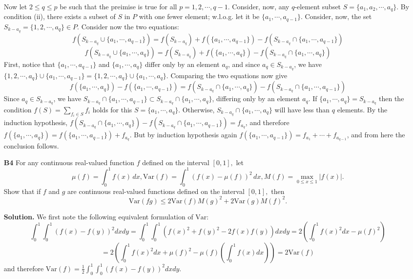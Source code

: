 \documentclass[11pt,a4paper]{article}
\newcommand{\<}{\langle}
\renewcommand{\>}{\rangle}
\newcommand{\dsum}{\displaystyle\sum}
\begin{document}
\begin{enumerate}
	Now let $2\le q\le p$ be such that the preimise is true for all $p=1, 2, \cdots , q-1$. Consider, now, any $q$-element subset $S=\{a_1, a_2, \cdots , a_q\}$. By condition (ii), there exists a subset of $S$ in $P$ with one fewer element; w.l.o.g. let it be $\{a_1, \cdots , a_{q-1}\}$. Consider, now, the set $S_{k-a_q}=\{1, 2, \cdots , a_q\}\in P.$ Consider now the two equations: 
	\[
	f(S_{k-a_q}\cup \{a_1, \cdots , a_{q-1}\}) = f(S_{k-a_q}) + f(\{a_1, \cdots , a_{q-1}\}) - f(S_{k-a_q}\cap \{a_1, \cdots , a_{q-1}\})
	\]
	\[
	f(S_{k-a_q}\cup \{a_1, \cdots , a_{q}\}) = f(S_{k-a_q}) + f(\{a_1, \cdots , a_{q}\}) - f(S_{k-a_q}\cap \{a_1, \cdots , a_{q}\})
	\]
	First, notice that $\{a_1, \cdots , a_{q-1}\}$ and $\{a_1, \cdots , a_{q}\}$ differ only by an element $a_q$, and since $a_q\in S_{k-a_q}$, we have $\{1, 2, \cdots , a_q\}\cup \{a_1, \cdots , a_{q-1}\} = \{1, 2, \cdots , a_q\}\cup \{a_1, \cdots , a_{q}\}$. 
	Comparing the two equations now give
	\[
	f(\{a_1, \cdots , a_{q}\}) - f(\{a_1, \cdots , a_{q-1}\}) = f(S_{k-a_q}\cap \{a_1, \cdots , a_{q}\}) - f(S_{k-a_q}\cap \{a_1, \cdots , a_{q-1}\})
	\]
	Since $a_q\in S_{k-a_q}$, we have $S_{k-a_q}\cap \{a_1, \cdots , a_{q-1}\}\subset S_{k-a_q}\cap \{a_1, \cdots , a_{q}\}$, differing only by an element $a_q$. 
	If $\{a_1, \cdots , a_q\}=S_{k-a_q}$ then the condition $f(S)=\dsum_{f_i\in S}f_i$ holds for this $S=\{a_1, \cdots, a_q\}$. 
	Otherwise, $S_{k-a_q}\cap \{a_1, \cdots , a_{q}\}$ will have less than $q$ elements. By the induction hypothesis, $f(S_{k-a_q}\cap \{a_1, \cdots , a_{q}\}) - f(S_{k-a_q}\cap \{a_1, \cdots , a_{q-1}\})=f_{a_q}$, and therefore $f(\{a_1, \cdots , a_{q}\}) = f(\{a_1, \cdots , a_{q-1}\}) + f_{a_q}$. But by induction hypothesis again $f(\{a_1, \cdots , a_{q-1}\}) = f_{a_1} + \cdots + f_{a_{q-1}}$, and from here the conclusion follows. 
	
	\item[\textbf{B4}] 
	For any continuous real-valued function $f$ defined on the interval $[0,1],$ let\[\mu(f)=\int_0^1f(x)\,dx,\text{Var}(f)=\int_0^1(f(x)-\mu(f))^2\,dx, M(f)=\max_{0\le x\le 1}|f(x)|.\]Show that if $f$ and $g$ are continuous real-valued functions defined on the interval $[0,1],$ then\[\text{Var}(fg)\le 2\text{Var}(f)M(g)^2+2\text{Var}(g)M(f)^2.\]
	
	\textbf{Solution.} 
	We first note the following equivalent formulation of $\text{Var}$: 
	\[
	\int_0^1 \int_0^1 (f(x) - f(y))^2 dx dy
	=\int_0^1 \int_0^1 (f(x)^2 + f(y)^2 - 2f(x)f(y)) dx dy
	=2(\int_0^1 f(x)^2 dx - \mu(f)^2)
	\]\[
	=2(\int_0^1 f(x)^2 dx + \mu(f)^2 - \mu(f)(\int_0^1 f(x) dx))
	=2\text{Var}(f)
	\]
	and therefore $\text{Var}(f) = \frac 12 \int_0^1 \int_0^1 (f(x) - f(y))^2 dx dy$. 
	

\end{enumerate}
\end{document}
